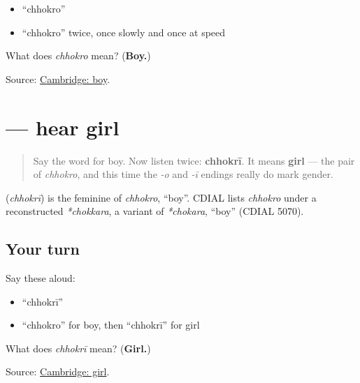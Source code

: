 \begin{itemize}
\raggedright
  \item \textquotedblleft{}chhokro\textquotedblright{}
  \item \textquotedblleft{}chhokro\textquotedblright{} twice, once slowly and once at speed
\end{itemize}

\begin{tcolorbox}[breakable,colback=teal!4,colframe=teal!35!black,title={Before you move on}]
What does \emph{chhokro} mean? (\textbf{Boy.})

Source: \href{https://dictionary.cambridge.org/dictionary/english-gujarati/boy}{Cambridge: boy}.
\end{tcolorbox}
\section[\texorpdfstring{\gu{છોકરી} (chhokrī)}{છોકરી (chhokrī)}]{ — hear girl}

\label{lesson:GU-C30-hear-chhokri}



\begin{quote}
Say the word for boy. Now listen twice: \textbf{chhokrī}. It means \textbf{girl} — the pair of \emph{chhokro}, and this time the \emph{-o} and \emph{-ī} endings really do mark gender.
\end{quote}

\begin{cousinweb}
\textbf{} (\emph{chhokrī}) is the feminine of \emph{chhokro}, \textquotedblleft{}boy\textquotedblright{}. CDIAL lists \emph{chhokro} under a reconstructed \emph{*chokkara}, a variant of \emph{*chokara}, \textquotedblleft{}boy\textquotedblright{} (CDIAL 5070).
\end{cousinweb}

\subsection*{Your turn}
Say these aloud:

\begin{itemize}
\raggedright
  \item \textquotedblleft{}chhokrī\textquotedblright{}
  \item \textquotedblleft{}chhokro\textquotedblright{} for boy, then \textquotedblleft{}chhokrī\textquotedblright{} for girl
\end{itemize}

\begin{tcolorbox}[breakable,colback=teal!4,colframe=teal!35!black,title={Before you move on}]
What does \emph{chhokrī} mean? (\textbf{Girl.})

Source: \href{https://dictionary.cambridge.org/dictionary/english-gujarati/girl}{Cambridge: girl}.
\end{tcolorbox}
